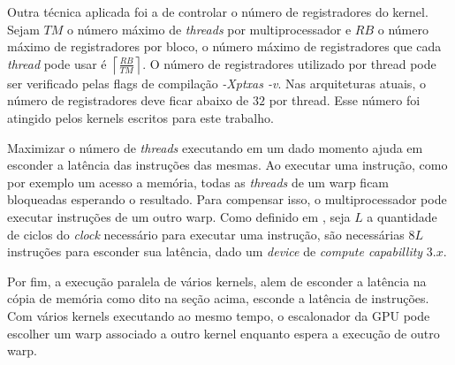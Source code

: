   Outra técnica aplicada foi a de controlar o número de registradores do kernel.
Sejam $TM$ o número máximo de \textit{threads} por multiprocessador e $RB$ o
número máximo de registradores por bloco, o número máximo de registradores que
cada \textit{thread} pode usar é $\left \lceil{\frac{RB}{TM}}\right \rceil$.
O número de registradores utilizado por thread pode ser verificado pelas flags
de compilação \textit{-Xptxas -v}. Nas arquiteturas atuais, o número de
registradores deve ficar abaixo de $32$ por thread. Esse número foi atingido pelos
kernels escritos para este trabalho.

  Maximizar o número de \textit{threads} executando em um dado momento ajuda em
esconder a latência das instruções das mesmas. Ao executar uma instrução,
como por exemplo um acesso a memória, todas as \textit{threads} de um warp
ficam bloqueadas esperando o resultado. Para compensar isso, o multiprocessador
pode executar instruções de um outro warp. Como definido em \cite{cudaProgrammingGuide},
seja $L$ a quantidade de ciclos do \textit{clock} necessário para executar uma
instrução, são necessárias $8L$ instruções para esconder sua latência, dado um
\textit{device} de \textit{compute capabillity} $3.x$.

  Por fim, a execução paralela de vários kernels, alem de esconder a latência
na cópia de memória como dito na seção acima, esconde a latência de instruções.
Com vários kernels executando ao mesmo tempo, o escalonador da GPU pode escolher
um warp associado a outro kernel enquanto espera a execução de outro warp.
